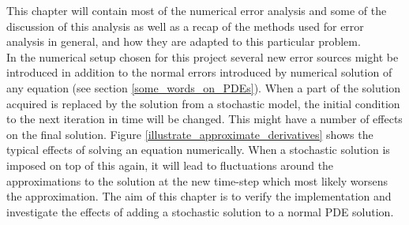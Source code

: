 
This chapter will contain most of the numerical error analysis and some of the discussion of this analysis as well as a recap of the methods used for error analysis in general, and how they are adapted to this particular problem.\\


In the numerical setup chosen for this project several new error sources might be introduced in addition to the normal errors introduced by numerical solution of any equation (see section \ref{some_words_on_PDEs}). 
When a part of the solution acquired is replaced by the solution from a stochastic model, the initial condition to the next iteration in time will be changed. 
This might have a number of effects on the final solution. 
Figure \ref{illustrate_approximate_derivatives} shows the typical effects of solving an equation numerically. When a stochastic solution is imposed on top of this again, it will lead to fluctuations around the approximations to the solution at the new time-step which most likely worsens the approximation.
The aim of this chapter is to verify the implementation and investigate the effects of adding a stochastic solution to a normal PDE solution.


